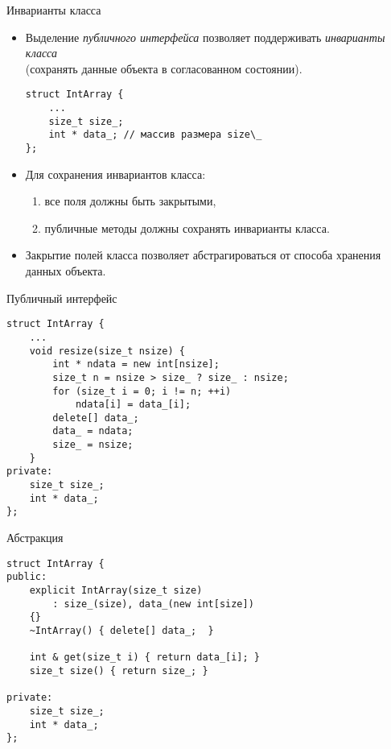 \documentclass{beamer}
\begin{document}
\begin{frame}[fragile]{Инварианты класса}{}
    \begin{itemize}
        \item Выделение {\em публичного интерфейса} позволяет
            поддерживать {\em инварианты класса}\\
            (сохранять
            данные объекта в согласованном состоянии).
\begin{lstlisting}
struct IntArray {
    ...
    size_t size_;
    int * data_; // массив размера size\_
};
\end{lstlisting}
        
        \item Для сохранения инвариантов класса:
            \begin{enumerate}
                \item все поля должны быть закрытыми, 
                \item публичные методы должны сохранять инварианты класса.
            \end{enumerate}

        \item Закрытие полей класса позволяет абстрагироваться 
            от способа хранения данных объекта.
    \end{itemize}
\end{frame}

\begin{frame}[fragile]{Публичный интерфейс}{}
\begin{lstlisting}
struct IntArray {
    ...
    void resize(size_t nsize) {
        int * ndata = new int[nsize];
        size_t n = nsize > size_ ? size_ : nsize;
        for (size_t i = 0; i != n; ++i)
            ndata[i] = data_[i];
        delete[] data_;
        data_ = ndata;
        size_ = nsize;
    }
private:
    size_t size_;
    int * data_;
};
\end{lstlisting}
\end{frame}

\begin{frame}[fragile]{Абстракция}{}
\begin{lstlisting}
struct IntArray {
public:
    explicit IntArray(size_t size) 
        : size_(size), data_(new int[size]) 
    {}
    ~IntArray() { delete[] data_;  }

    int & get(size_t i) { return data_[i]; }
    size_t size() { return size_; }

private:
    size_t size_;
    int * data_;
};
\end{lstlisting}
\end{frame}
\end{document}
